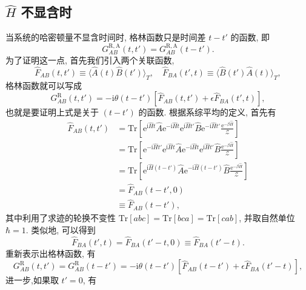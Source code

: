 \subsection{$\hat H$ 不显含时}
当系统的哈密顿量不显含时间时, 格林函数只是时间差 $t-t'$ 的函数, 即
\begin{equation}
    G_{AB}^{\mathrm{R,A}}(t,t')=G_{AB}^{\mathrm{R,A}}(t-t').
\end{equation}
为了证明这一点, 首先我们引入两个关联函数,
\begin{equation}
    \hat F_{AB}(t,t')\equiv\langle \hat A(t)\hat B(t') \rangle_T,\quad \hat F_{BA}(t',t)\equiv \langle \hat B(t')\hat A(t) \rangle_T,
\end{equation}
格林函数就可以写成
\begin{equation}
    G_{AB}^{\mathrm{R}}(t,t')=-\mathrm{i}\theta(t-t')\left[ \hat F_{AB}(t,t')+\epsilon\hat F_{BA}(t',t) \right],
\end{equation}
也就是要证明上式是关于 $(t-t')$ 的函数. 根据系综平均的定义, 首先有
    \begin{align}
    \hat F_{AB}(t,t')&=\mathrm{Tr}\left[ \mathrm{e}^{\mathrm{i}\hat Ht}\hat A\mathrm{e}^{-\mathrm{i}\hat H t}\mathrm{e}^{\mathrm{i}\hat Ht'}\hat B\mathrm{e}^{-\mathrm{i}\hat Ht'}\frac{\mathrm{e}^{-\beta\hat H}}{\mathcal{Z}} \right]\nonumber\\
    &=\mathrm{Tr}\left[ \mathrm{e}^{-\mathrm{i}\hat Ht'}\mathrm{e}^{\mathrm{i}\hat Ht}\hat A\mathrm{e}^{-\mathrm{i}\hat Ht}\mathrm{e}^{\mathrm{i}\hat Ht'}\hat B\frac{\mathrm{e}^{-\beta \hat H}}{\mathcal{Z}} \right]\nonumber\\
    &=\mathrm{Tr}\left[ \mathrm{e}^{\mathrm{i}\hat H(t-t')}\hat A\mathrm{e}^{-\mathrm{i}\hat H(t-t')}\hat B\frac{\mathrm{e}^{-\beta\hat H}}{\mathcal{Z}} \right]\nonumber\\
    &=\hat F_{AB}(t-t',0)\nonumber\\
    &\equiv \hat F_{AB}(t-t'),
    \end{align}
其中利用了求迹的轮换不变性 $\mathrm{Tr}[abc]=\mathrm{Tr}[bca]=\mathrm{Tr}[cab]$, 并取自然单位 $\hbar=1$. 类似地, 可以得到
\begin{equation}
    \hat F_{BA}(t',t)=\hat F_{BA}(t'-t,0)\equiv \hat F_{BA}(t'-t).
\end{equation}
重新表示出格林函数, 有
\begin{equation}
    G_{AB}^{\mathrm{R}}(t,t')=G_{AB}^{\mathrm{R}}(t-t')=-\mathrm{i}\theta(t-t')\left[ \hat F_{AB}(t-t')+\epsilon \hat F_{BA}(t'-t) \right],
\end{equation}
进一步,如果取 $t'=0$, 有
